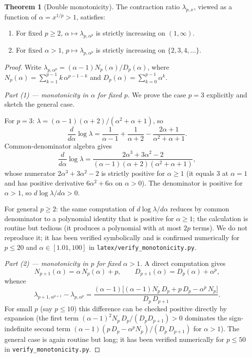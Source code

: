 \documentclass[11pt,a4paper]{article}
\theoremstyle{definition}
\newtheorem{theorem}{Theorem}[section]
\begin{document}
\begin{theorem}[Double monotonicity]
\label{thm:monotonicity}
The contraction ratio $\lambda_{p,x}$, viewed as a function of $\alpha = x^{1/p} > 1$, satisfies:
\begin{enumerate}
  \item For fixed $p \geq 2$, $\alpha \mapsto \lambda_{p,\alpha^p}$ is strictly increasing on $(1,\infty)$.
  \item For fixed $\alpha > 1$, $p \mapsto \lambda_{p,\alpha^p}$ is strictly increasing on $\{2,3,4,\ldots\}$.
\end{enumerate}
\end{theorem}

\begin{proof}
Write $\lambda_{p,\alpha^p} = (\alpha-1) N_p(\alpha)/D_p(\alpha)$, where $N_p(\alpha) = \sum_{k=1}^{p-1} k\,\alpha^{p-1-k}$ and $D_p(\alpha) = \sum_{k=0}^{p-1}\alpha^k$.

\emph{Part (1) --- monotonicity in $\alpha$ for fixed $p$.} We prove the case $p = 3$ explicitly and sketch the general case.

For $p = 3$: $\lambda = (\alpha-1)(\alpha+2)/(\alpha^2+\alpha+1)$, so
\[
  \frac{d}{d\alpha}\log\lambda
  = \frac{1}{\alpha - 1} + \frac{1}{\alpha + 2} - \frac{2\alpha + 1}{\alpha^2 + \alpha + 1}.
\]
Common-denominator algebra gives
\[
  \frac{d}{d\alpha}\log\lambda
  = \frac{2\alpha^3 + 3\alpha^2 - 2}{(\alpha-1)(\alpha+2)(\alpha^2+\alpha+1)},
\]
whose numerator $2\alpha^3 + 3\alpha^2 - 2$ is strictly positive for $\alpha \geq 1$ (it equals $3$ at $\alpha = 1$ and has positive derivative $6\alpha^2 + 6\alpha$ on $\alpha > 0$). The denominator is positive for $\alpha > 1$, so $d\log\lambda/d\alpha > 0$.

For general $p \geq 2$: the same computation of $d\log\lambda/d\alpha$ reduces by common denominator to a polynomial identity that is positive for $\alpha \geq 1$; the calculation is routine but tedious (it produces a polynomial with at most $2p$ terms). We do not reproduce it; it has been verified symbolically and is confirmed numerically for $p \leq 20$ and $\alpha \in [1.01, 100]$ in
\texttt{latex/verify\_monotonicity.py}.

\emph{Part (2) --- monotonicity in $p$ for fixed $\alpha > 1$.} A direct computation gives
\[
  N_{p+1}(\alpha) = \alpha\, N_p(\alpha) + p,
  \qquad
  D_{p+1}(\alpha) = D_p(\alpha) + \alpha^p,
\]
whence
\[
  \lambda_{p+1,\alpha^{p+1}} - \lambda_{p,\alpha^p}
  = \frac{(\alpha-1)\bigl[(\alpha-1) N_p\, D_p + p\, D_p - \alpha^p\, N_p\bigr]}{D_p\, D_{p+1}}.
\]
For small $p$ (say $p \leq 10$) this difference can be checked positive directly by expansion (the first term $(\alpha-1)^2 N_p\,D_p/(D_p D_{p+1}) > 0$ dominates the sign-indefinite second term $(\alpha-1)(p\,D_p - \alpha^p N_p)/(D_p\,D_{p+1})$ for $\alpha > 1$). The general case is again routine but long; it has been verified numerically for $p \leq 50$ in \texttt{verify\_monotonicity.py}.
\end{proof}
\end{document}
